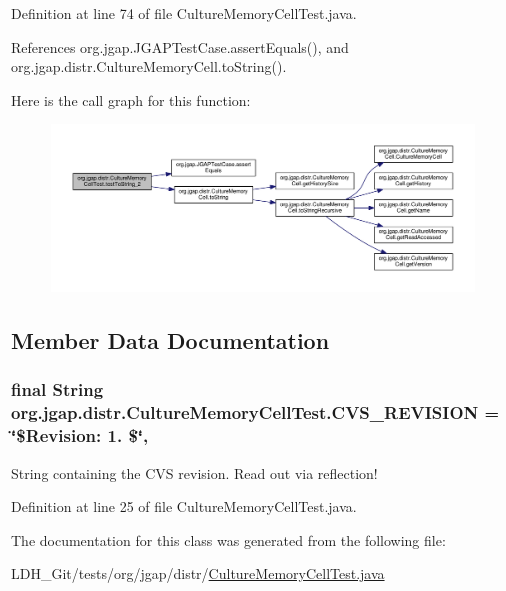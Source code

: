 Definition at line 74 of file Culture\-Memory\-Cell\-Test.\-java.



References org.\-jgap.\-J\-G\-A\-P\-Test\-Case.\-assert\-Equals(), and org.\-jgap.\-distr.\-Culture\-Memory\-Cell.\-to\-String().



Here is the call graph for this function\-:
\nopagebreak
\begin{figure}[H]
\begin{center}
\leavevmode
\includegraphics[width=350pt]{classorg_1_1jgap_1_1distr_1_1_culture_memory_cell_test_a17be8b62fb6dfe056884df9a1e6459da_cgraph}
\end{center}
\end{figure}




\subsection{Member Data Documentation}
\hypertarget{classorg_1_1jgap_1_1distr_1_1_culture_memory_cell_test_a88ab5c626c6a12dff296d53bf59adb90}{
\subsubsection[{C\-V\-S\-\_\-\-R\-E\-V\-I\-S\-I\-O\-N}]{\setlength{\rightskip}{0pt plus 5cm}final String org.\-jgap.\-distr.\-Culture\-Memory\-Cell\-Test.\-C\-V\-S\-\_\-\-R\-E\-V\-I\-S\-I\-O\-N = \char`\"{}\$Revision\-: 1. \$\char`\"{}\hspace{0.3cm}{\ttfamily [static]}, {\ttfamily [private]}}}\label{classorg_1_1jgap_1_1distr_1_1_culture_memory_cell_test_a88ab5c626c6a12dff296d53bf59adb90}
String containing the C\-V\-S revision. Read out via reflection! 

Definition at line 25 of file Culture\-Memory\-Cell\-Test.\-java.



The documentation for this class was generated from the following file\-:\begin{DoxyCompactItemize}
\item 
L\-D\-H\-\_\-\-Git/tests/org/jgap/distr/\hyperlink{_culture_memory_cell_test_8java}{Culture\-Memory\-Cell\-Test.\-java}\end{DoxyCompactItemize}
